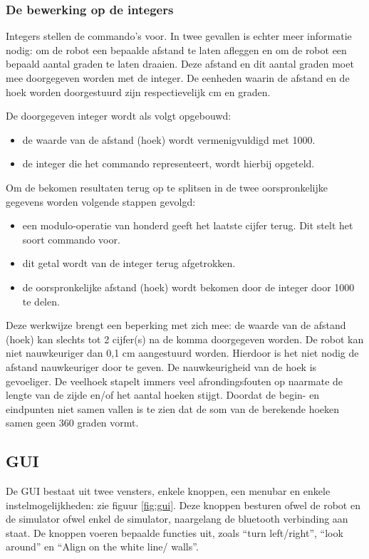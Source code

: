 \documentclass[tt3]{penoverslag}
\begin{document}
\subsubsection{De bewerking op de integers} %
\label{sssec:integer}
Integers stellen de commando's voor. In twee gevallen is echter meer informatie nodig: om de robot een bepaalde afstand te laten afleggen en om de robot een bepaald aantal graden te laten draaien. Deze afstand en dit aantal graden moet mee doorgegeven worden met de integer. De eenheden waarin de afstand en de hoek worden doorgestuurd zijn respectievelijk cm en graden.

De doorgegeven integer wordt als volgt opgebouwd:

\begin{itemize}
\item de waarde van de afstand (hoek) wordt vermenigvuldigd met 1000.
\item de integer die het commando representeert, wordt hierbij opgeteld.
\end{itemize}

Om de bekomen resultaten terug op te splitsen in de twee oorspronkelijke gegevens worden volgende stappen gevolgd:

\begin{itemize}
\item een modulo-operatie van honderd geeft het laatste cijfer terug. Dit stelt het soort commando voor.
\item dit getal wordt van de integer terug afgetrokken.
\item de oorspronkelijke afstand (hoek) wordt bekomen door de integer door 1000 te delen.
\end{itemize}

Deze werkwijze brengt een beperking met zich mee: de waarde van de afstand (hoek) kan slechts tot 2 cijfer(s) na de komma doorgegeven worden. De robot kan niet nauwkeuriger dan 0,1 cm aangestuurd worden. Hierdoor is het niet nodig de afstand nauwkeuriger door te geven. De nauwkeurigheid van de hoek is gevoeliger. De veelhoek stapelt immers veel afrondingsfouten op naarmate de lengte van de zijde en/of het aantal hoeken stijgt. Doordat de begin- en eindpunten niet samen vallen is te zien dat de som van de berekende hoeken samen geen 360 graden vormt. 

\subsection{GUI} %
\label{ssec:GUI}
De GUI bestaat uit twee vensters, enkele knoppen, een menubar en enkele instelmogelijkheden: zie figuur \ref{fig:gui}. Deze knoppen besturen ofwel de robot en de simulator ofwel enkel de simulator, naargelang de bluetooth verbinding aan staat. De knoppen voeren bepaalde functies uit, zoals ``turn left/right'', ``look around'' en ``Align on the white line/ walls''.\\
\end{document}
